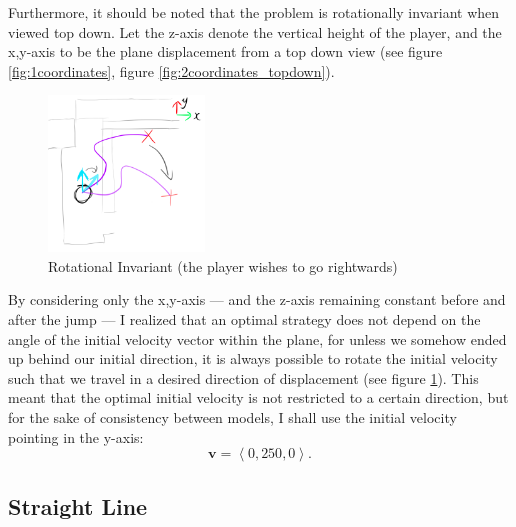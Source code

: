 \documentclass[a4paper,12pt]{article}
\newcommand{\tvec}[1]{\boldsymbol{#1}}
\newcommand{\tang}[1]{\left\langle #1 \right\rangle}
\newcommand{\tv}{\tvec{v}}
\begin{document}
Furthermore, it should be noted that the problem is rotationally invariant when viewed top down. Let the z-axis denote the vertical height of the player, and the x,y-axis to be the plane displacement from a top down view (see figure \ref{fig:1coordinates}, figure \ref{fig:2coordinates_topdown}). \begin{figure}
    \includegraphics[width=0.37\textwidth,right]{assets/2turning.png}
    \caption{Rotational Invariant (the player wishes to go rightwards)}
    \label{fig:2turning}
\end{figure}
By considering only the x,y-axis --- and the z-axis remaining constant before and after the jump --- I realized that an optimal strategy does not depend on the angle of the initial velocity vector within the plane, for unless we somehow ended up behind our initial direction, it is always possible to rotate the initial velocity such that we travel in a desired direction of displacement (see figure \ref{fig:2turning}). This meant that the optimal initial velocity is not restricted to a certain direction, but for the sake of consistency between models, I shall use the initial velocity pointing in the y-axis:
\[
    \tv = \tang{0, 250, 0}.
\]

\subsection{Straight Line}
\end{document}
